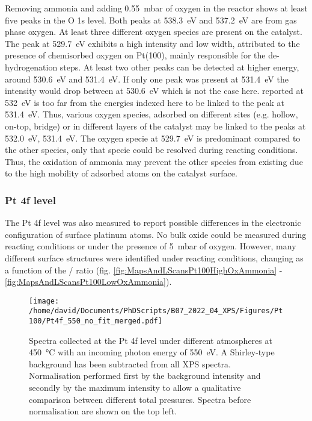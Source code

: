 Removing ammonia and adding \qty{0.55}{\milli\bar} of oxygen in the reactor shows at least five peaks in the O 1s level.
Both peaks at \qty{538.3}{\eV} and \qty{537.2}{\eV} are from gas phase oxygen.
At least three different oxygen species are present on the catalyst.
The peak at \qty{529.7}{\eV} exhibits a high intensity and low width, attributed to the presence of chemisorbed oxygen on Pt(100), mainly responsible for the de-hydrogenation steps.
At least two other peaks can be detected at higher energy, around \qty{530.6}{\eV} and \qty{531.4}{\eV}.
If only one peak was present at \qty{531.4}{\eV} the intensity would drop between at \qty{530.6}{\eV} which is not the case here.
 reported at \qty{532}{\eV} \parencite{Kondratenko2006} is too far from the energies indexed here to be linked to the peak at \qty{531.4}{\eV}.
Thus, various oxygen species, adsorbed on different sites (e.g. hollow, on-top, bridge) or in different layers of the catalyst may be linked to the peaks at \qty{532.0}{\eV}, \qty{531.4}{\eV}.
The oxygen specie at \qty{529.7}{\eV} is predominant compared to the other species, only that specie could be resolved during reacting conditions.
Thus, the oxidation of ammonia may prevent the other species from existing due to the high mobility of adsorbed atoms on the catalyst surface.

\subsubsection{Pt 4f level}

The Pt 4f level was also measured to report possible differences in the electronic configuration of surface platinum atoms.
No bulk oxide could be measured during reacting conditions or under the presence of \qty{5}{\milli\bar} of oxygen.
However, many different surface structures were identified under reacting conditions, changing as a function of the / ratio (fig. \ref{fig:MapsAndLScansPt100HighOxAmmonia} - \ref{fig:MapsAndLScansPt100LowOxAmmonia}).

\begin{figure}[!htb]
    \centering
    \texttt{[image: /home/david/Documents/PhDScripts/B07\_2022\_04\_XPS/Figures/Pt100/Pt4f\_550\_no\_fit\_merged.pdf]}
    \caption{
        Spectra collected at the Pt 4f level under different atmospheres at \qty{450}{\degreeCelsius} with an incoming photon energy of \qty{550}{\eV}.
        A Shirley-type background has been subtracted from all XPS spectra.
        Normalisation performed first by the background intensity and secondly by the maximum intensity to allow a qualitative comparison between different total pressures.
        Spectra before normalisation are shown on the top left.
    }
    \label{fig:Pt4fPt100}
\end{figure}

